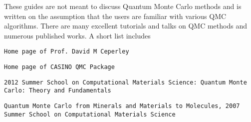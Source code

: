 

These guides are not meant to discuss Quantum Monte Carlo methods and is written on the assumption that the users are familiar with various Q\-M\-C algorithms. There are many excellent tutorials and talks on Q\-M\-C methods and numerous published works. A short list includes


\begin{DoxyItemize}
\item {\tt Home page of Prof. David M Ceperley}
\item {\tt Home page of C\-A\-S\-I\-N\-O Q\-M\-C Package}
\item {\tt 2012 Summer School on Computational Materials Science\-: Quantum Monte Carlo\-: Theory and Fundamentals}
\item {\tt Quantum Monte Carlo from Minerals and Materials to Molecules, 2007 Summer School on Computational Materials Science} 
\end{DoxyItemize}